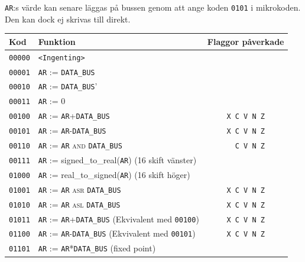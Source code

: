 \documentclass[]{article}
\begin{document}
\texttt{AR}:s värde kan senare läggas på bussen genom att ange koden \texttt{0101} i mikrokoden. Den kan dock ej skrivas till direkt.
\\
\begin{table}[H]
\centering
\begin{tabular}{llc}
	\textbf{Kod}    & \textbf{Funktion}                                                                & \textbf{Flaggor påverkade} \\ \hline
	\texttt{00000}  & \texttt{<Ingenting>}                                                             &  \\
	\texttt{00001}  & \texttt{AR} := \texttt{DATA\_BUS}                                                &  \\
	\texttt{00010}  & \texttt{AR} := \texttt{DATA\_BUS}'                                               &  \\
	\texttt{00011}  & \texttt{AR} := 0                                                                 &  \\
	\texttt{00100}  & \texttt{AR} := \texttt{AR}+\texttt{DATA\_BUS}                                    &  \texttt{X C V N Z}     \\
	\texttt{00101}  & \texttt{AR} := \texttt{AR}-\texttt{DATA\_BUS}                                    &  \texttt{X C V N Z}     \\
	\texttt{00110}  & \texttt{AR} := \texttt{AR} \textsc{and} \texttt{DATA\_BUS}                       &  \texttt{{ } C V N Z}    \\
	\texttt{00111}  & \texttt{AR} := signed\_to\_real(\texttt{AR}) (16 skift vänster)                  &  \\
	\texttt{01000}  & \texttt{AR} := real\_to\_signed(\texttt{AR}) (16 skift höger)                    &  \\
	\texttt{01001}  & \texttt{AR} := \texttt{AR} \textsc{asr} \texttt{DATA\_BUS}                       &  \texttt{X C V N Z}     \\
	\texttt{01010}  & \texttt{AR} := \texttt{AR} \textsc{asl} \texttt{DATA\_BUS}                       &  \texttt{X C V N Z}     \\
	\texttt{01011}  & \texttt{AR} := \texttt{AR}+\texttt{DATA\_BUS} (Ekvivalent med \texttt{00100})    &  \texttt{X C V N Z}     \\
	\texttt{01100}  & \texttt{AR} := \texttt{AR}-\texttt{DATA\_BUS} (Ekvivalent med \texttt{00101})    &  \texttt{X C V N Z}     \\
	\texttt{01101}  & \texttt{AR} := \texttt{AR}*\texttt{DATA\_BUS} (fixed point)                      &  \\

\end{tabular}
\end{table}
\end{document}
